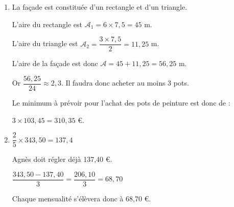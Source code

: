 
\medskip

\begin{enumerate}
\item La façade est constituée d'un rectangle et d'un triangle.

L'aire du rectangle est $\mathscr{A}_1 = 6 \times 7,5 = 45$ m.

L'aire du triangle est $\mathscr{A}_2 = \dfrac{3 \times 7,5}{2} = 11,25$ m.

L'aire de la façade est donc $\mathscr{A} = 45 + 11,25 = 56,25$ m.

Or $\dfrac{56,25}{24} \approx 2,3$. Il faudra donc acheter au moins 3 pots.

Le minimum à prévoir pour l'achat des pots de peinture est donc de :

$3 \times 103,45 = 310,35$ \euro.
\item $\dfrac{2}{5} \times 343,50 = 137,4$

Agnès doit régler déjà 137,40 \euro.

$\dfrac{343,50 - 137,40}{3} = \dfrac{206,10}{3} = 68,70$

Chaque mensualité s'élèvera donc à 68,70 \euro.
\end{enumerate}

\medskip

